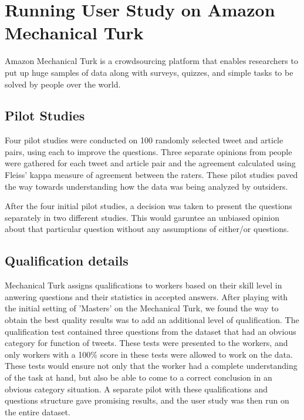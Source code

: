 

\section{Running User Study on Amazon Mechanical Turk}

Amazon Mechanical Turk is a crowdsourcing platform that enables researchers to put up huge samples of data along with surveys, quizzes, and simple tasks to be solved by people over the world.

\subsection{Pilot Studies}

 Four pilot studies were conducted on 100 randomly selected tweet and article pairs, using each to improve the questions. Three separate opinions from people were gathered for each tweet and article pair and the agreement calculated using Fleiss' kappa measure of agreement between the raters. These pilot studies paved the way towards understanding how the data was being analyzed by outsiders. 
 
 After the four initial pilot studies, a decision was taken to present the questions separately in two different studies. This would garuntee an unbiased opinion about that particular question without any assumptions of either/or questions.

\subsection{Qualification details}

Mechanical Turk assigns qualifications to workers based on their skill level in anwering questions and their statistics in accepted answers. After playing with the initial setting of 'Masters' on the Mechanical Turk, we found the way to obtain the best quality results was to add an additional level of qualification. The qualification test contained three questions from the dataset that had an obvious category for function of tweets. These tests were presented to the workers, and only workers with a 100\% score in these tests were allowed to work on the data. These tests would ensure not only that the worker had a complete understanding of the task at hand, but also be able to come to a correct conclusion in an obvious category situation. A separate pilot with these qualifications and questions structure gave promising results, and the user study was then run on the entire dataset.

